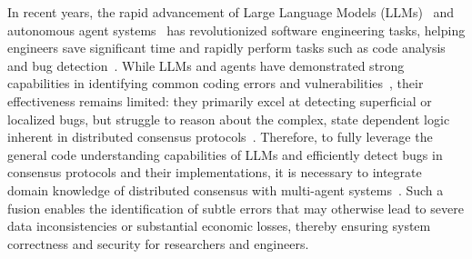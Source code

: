 \documentclass{article}
\theoremstyle{plain}
\theoremstyle{definition}
\theoremstyle{remark}
\begin{document}
In recent years, the rapid advancement of Large Language Models (LLMs)~\cite{Achiam2023GPT4TR,DeepSeekAI2025DeepSeekR1IR} and autonomous agent systems~\cite{yao2022react,cheng2024exploring} has revolutionized software engineering tasks, helping engineers save significant time and rapidly perform tasks such as code analysis~\cite{feng2020codebert} and bug detection~\cite{chen2021evaluating}. While LLMs and agents have demonstrated strong capabilities in identifying common coding errors and vulnerabilities~\cite{Kaniewski2025ASL}, their effectiveness remains limited: they primarily excel at detecting superficial or localized bugs, but struggle to reason about the complex, state dependent logic inherent in distributed consensus protocols~\cite{Wang2024SanitizingLL,Wang2024LLMDFAAD}.
Therefore, to fully leverage the general code understanding capabilities of LLMs and efficiently detect bugs in consensus protocols and their implementations, it is necessary to integrate domain knowledge of distributed consensus with multi-agent systems~\cite{Yang2025KernelGPTEK,Yang2025KNighterTS}. Such a fusion enables the identification of subtle errors that may otherwise lead to severe data inconsistencies or substantial economic losses, thereby ensuring system correctness and security for researchers and engineers.
\end{document}

